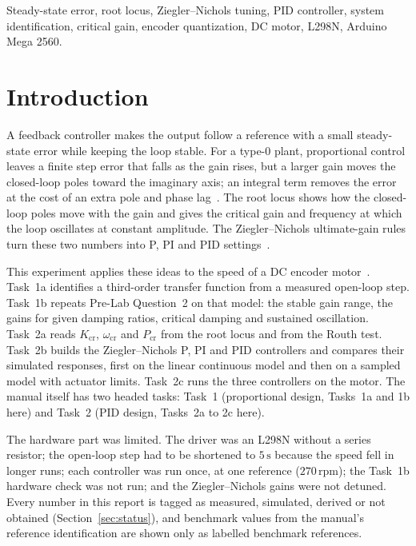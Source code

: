 \documentclass[lettersize,journal]{IEEEtran}
\newcommand{\Kcr}{K_{\mathrm{cr}}}
\newcommand{\wcr}{\omega_{\mathrm{cr}}}
\newcommand{\Pcr}{P_{\mathrm{cr}}}
\newcommand{\rpm}{\,\text{rpm}}
\begin{document}
\begin{IEEEkeywords}
Steady-state error, root locus, Ziegler--Nichols tuning, PID controller, system identification, critical gain, encoder quantization, DC motor, L298N, Arduino Mega 2560.
\end{IEEEkeywords}

\section{Introduction}
A feedback controller makes the output follow a reference with a small steady-state error while keeping the loop stable. For a type-0 plant, proportional control leaves a finite step error that falls as the gain rises, but a larger gain moves the closed-loop poles toward the imaginary axis; an integral term removes the error at the cost of an extra pole and phase lag~\cite{ogata,franklin}. The root locus shows how the closed-loop poles move with the gain and gives the critical gain and frequency at which the loop oscillates at constant amplitude. The Ziegler--Nichols ultimate-gain rules turn these two numbers into P, PI and PID settings~\cite{zn,ogata}.

This experiment applies these ideas to the speed of a DC encoder motor~\cite{labmanual}. Task~1a identifies a third-order transfer function from a measured open-loop step. Task~1b repeats Pre-Lab Question~2 on that model: the stable gain range, the gains for given damping ratios, critical damping and sustained oscillation. Task~2a reads $\Kcr$, $\wcr$ and $\Pcr$ from the root locus and from the Routh test. Task~2b builds the Ziegler--Nichols P, PI and PID controllers and compares their simulated responses, first on the linear continuous model and then on a sampled model with actuator limits. Task~2c runs the three controllers on the motor. The manual itself has two headed tasks: Task~1 (proportional design, Tasks~1a and 1b here) and Task~2 (PID design, Tasks~2a to 2c here).

The hardware part was limited. The driver was an L298N without a series resistor; the open-loop step had to be shortened to $5\,\text{s}$ because the speed fell in longer runs; each controller was run once, at one reference ($270\rpm$); the Task~1b hardware check was not run; and the Ziegler--Nichols gains were not detuned. Every number in this report is tagged as measured, simulated, derived or not obtained (Section~\ref{sec:status}), and benchmark values from the manual's reference identification are shown only as labelled benchmark references.
\end{document}
